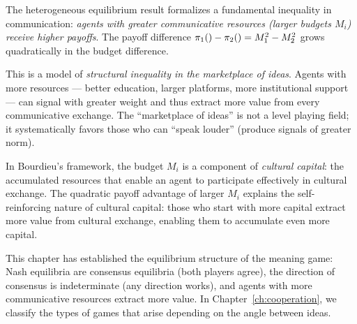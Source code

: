 \begin{interpretation}
\label{interp:inequality}
The heterogeneous equilibrium result formalizes a fundamental inequality in
communication: \emph{agents with greater communicative resources
(larger budgets $M_i$) receive higher payoffs}. The payoff difference
$\pi_{1}() - \pi_{2}() = M_1^2 - M_2^2$ grows quadratically in the
budget difference.

This is a model of \emph{structural inequality in the marketplace of ideas}.
Agents with more resources --- better education, larger platforms, more
institutional support --- can signal with greater weight and thus extract
more value from every communicative exchange. The ``marketplace of ideas''
is not a level playing field; it systematically favors those who can ``speak
louder'' (produce signals of greater norm).

In Bourdieu's framework, the budget $M_i$ is a component of \emph{cultural
capital}: the accumulated resources that enable an agent to participate
effectively in cultural exchange. The quadratic payoff advantage of larger
$M_i$ explains the self-reinforcing nature of cultural capital: those who
start with more capital extract more value from cultural exchange, enabling
them to accumulate even more capital.
\end{interpretation}

\bigskip

This chapter has established the equilibrium structure of the meaning game: Nash
equilibria are consensus equilibria (both players agree), the direction of
consensus is indeterminate (any direction works), and agents with more
communicative resources extract more value. In Chapter~\ref{ch:cooperation}, we
classify the types of games that arise depending on the angle between ideas.
